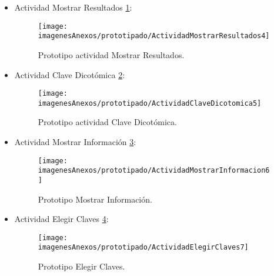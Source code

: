 \begin{itemize}
	
	\item Actividad Mostrar Resultados \ref{figActividadMostrarResultados4}:
	\begin{figure}[h]
    	\begin{center}%
        	\begin{center}%
          	\texttt{[image: imagenesAnexos/prototipado/ActividadMostrarResultados4]}%
          	\caption{Prototipo actividad Mostrar Resultados.}%
          	\label{figActividadMostrarResultados4}%
        	\end{center}%
  		\end{center}%
	\end{figure}%
	\clearpage
	
	
	\item Actividad Clave Dicotómica \ref{figActividadClaveDicotomica5}:
	\begin{figure}[h]
    	\begin{center}%
        	\begin{center}%
          	\texttt{[image: imagenesAnexos/prototipado/ActividadClaveDicotomica5]}%
          	\caption{Prototipo actividad Clave Dicotómica.}%
          	\label{figActividadClaveDicotomica5}%
        	\end{center}%
  		\end{center}%
	\end{figure}%
	\clearpage
	
	
	\item Actividad Mostrar Información \ref{figActividadMostrarInformacion6}:
	\begin{figure}[h]
    	\begin{center}%
        	\begin{center}%
          	\texttt{[image: imagenesAnexos/prototipado/ActividadMostrarInformacion6]}%
          	\caption{Prototipo Mostrar Información.}%
          	\label{figActividadMostrarInformacion6}%
        	\end{center}%
  		\end{center}%
	\end{figure}%
	\clearpage
	
	
	\item Actividad Elegir Claves \ref{figActividadElegirClaves7}:
	\begin{figure}[h]
    	\begin{center}%
        	\begin{center}%
          	\texttt{[image: imagenesAnexos/prototipado/ActividadElegirClaves7]}%
          	\caption{Prototipo Elegir Claves.}%
          	\label{figActividadElegirClaves7}%
        	\end{center}%
  		\end{center}%
	\end{figure}%
	\clearpage
	

\end{itemize}

